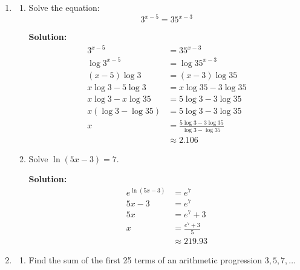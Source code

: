 \documentclass{report}
\newcommand{\sol}{\textbf{Solution:}}
\begin{document}
\begin{enumerate}[leftmargin=*]
    \item \begin{enumerate}
              \item Solve the equation:
                    \[3^{x-5}=35^{x-3}\]

                    \sol{}
                    \begin{align*}
                        3^{x-5}            & =35^{x-3}                                  \\
                        \log 3^{x-5}       & =\log 35^{x-3}                             \\
                        (x-5) \log 3       & =(x-3) \log 35                             \\
                        x \log 3-5\log 3   & =x \log 35-3\log 35                        \\
                        x \log 3-x \log 35 & =5\log 3 - 3\log 35                        \\
                        x(\log 3-\log 35)  & =5\log 3 - 3\log 35                        \\
                        x                  & =\frac{5\log 3 - 3\log 35}{\log 3-\log 35} \\
                                           & \approx 2.106
                    \end{align*}

                    \newpage
              \item Solve $\ln (5 x-3)=7$.

                    \sol{}
                    \begin{align*}
                        e^{\ln (5 x-3)} & = e^7             \\
                        5 x-3           & = e^7             \\
                        5 x             & = e^7+3           \\
                        x               & = \frac{e^7+3}{5} \\
                                        & \approx 219.93
                    \end{align*}
          \end{enumerate}

    \item \begin{enumerate}
              \item Find the sum of the first 25 terms of an arithmetic progression $3,5,7, \ldots$


\end{enumerate}
\end{enumerate}
\end{document}
